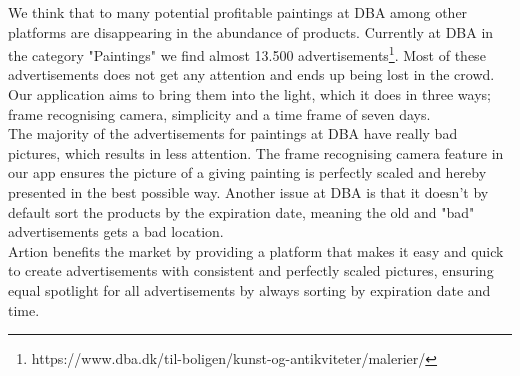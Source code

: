 We think that to many potential profitable paintings at DBA among other platforms are disappearing in the abundance of products. Currently at DBA in the category "Paintings" we find almost 13.500 advertisements\footnote{https://www.dba.dk/til-boligen/kunst-og-antikviteter/malerier/}. Most of these advertisements does not get any attention and ends up being lost in the crowd. Our application aims to bring them into the light, which it does in three ways; frame recognising camera, simplicity and a time frame of seven days.\\

The majority of the advertisements for paintings at DBA have really bad pictures, which results in less attention. The frame recognising camera feature in our app ensures the picture of a giving painting is perfectly scaled and hereby presented in the best possible way. Another issue at DBA is that it doesn't by default sort the products by the expiration date, meaning the old and "bad" advertisements gets a bad location. \\

Artion benefits the market by providing a platform that makes it easy and quick to create advertisements with consistent and perfectly scaled pictures, ensuring equal spotlight for all advertisements by always sorting by expiration date and time. 